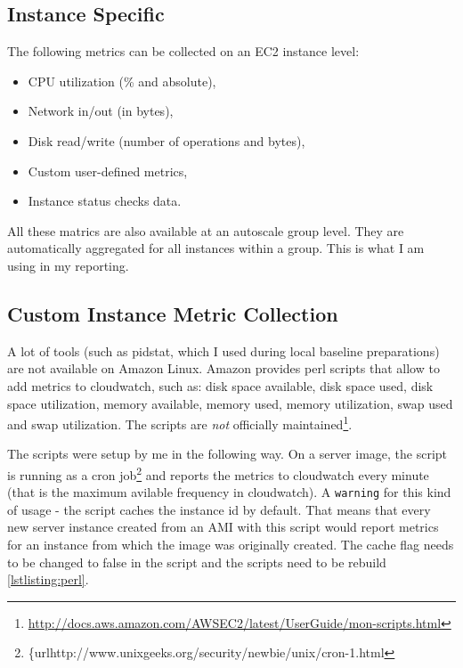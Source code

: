 \documentclass{uvamscse}
\begin{document}
\subsection{Instance Specific}
The following metrics can be collected on an EC2 instance level:
\begin{itemize}
  \item CPU utilization (\% and absolute),
  \item Network in/out (in bytes),
  \item Disk read/write (number of operations and bytes),
  \item Custom user-defined metrics,
  \item Instance status checks data.
\end{itemize}

All these matrics are also available at an autoscale group level. They are automatically aggregated for all instances within a group. This is what I am using in my reporting.

\subsection{Custom Instance Metric Collection} \label{Custom Metric Collection}
A lot of tools (such as pidstat, which I used during local baseline preparations) are not available on Amazon Linux. Amazon provides perl scripts that allow to add metrics to cloudwatch, such as: disk space available, disk space used, disk space utilization, memory available, memory used, memory utilization, swap used and swap utilization. The scripts are \textit{not} officially maintained\footnote{\url{http://docs.aws.amazon.com/AWSEC2/latest/UserGuide/mon-scripts.html}}.

The scripts were setup by me in the following way. On a server image, the script is running as a cron job\footnote{\{url{http://www.unixgeeks.org/security/newbie/unix/cron-1.html}} and reports the metrics to cloudwatch every minute (that is the maximum avilable frequency in cloudwatch). A \texttt{warning} for this kind of usage - the script caches the instance id by default. That means that every new server instance created from an AMI with this script would report metrics for an instance from which the image was originally created. The cache flag needs to be changed to false in the script and the scripts need to be rebuild \ref{lstlisting:perl}.
\end{document}
